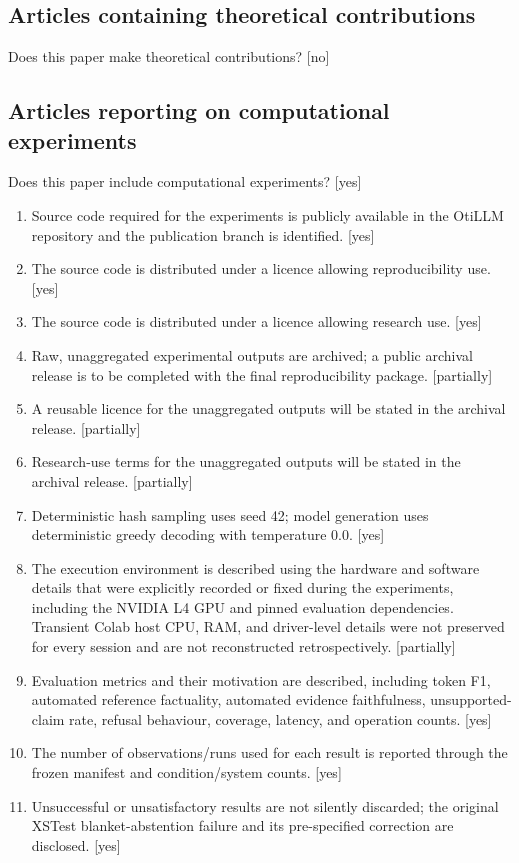 \documentclass[manuscript, screen, review]{jair}
\begin{document}
\subsection*{Articles containing theoretical contributions}
Does this paper make theoretical contributions? [no]

\subsection*{Articles reporting on computational experiments}
Does this paper include computational experiments? [yes]
\begin{enumerate}
\item Source code required for the experiments is publicly available in the OtiLLM repository and the publication branch is identified. [yes]
\item The source code is distributed under a licence allowing reproducibility use. [yes]
\item The source code is distributed under a licence allowing research use. [yes]
\item Raw, unaggregated experimental outputs are archived; a public archival release is to be completed with the final reproducibility package. [partially]
\item A reusable licence for the unaggregated outputs will be stated in the archival release. [partially]
\item Research-use terms for the unaggregated outputs will be stated in the archival release. [partially]
\item Deterministic hash sampling uses seed 42; model generation uses deterministic greedy decoding with temperature 0.0. [yes]
\item The execution environment is described using the hardware and software details that were explicitly recorded or fixed during the experiments, including the NVIDIA L4 GPU and pinned evaluation dependencies. Transient Colab host CPU, RAM, and driver-level details were not preserved for every session and are not reconstructed retrospectively. [partially]
\item Evaluation metrics and their motivation are described, including token F1, automated reference factuality, automated evidence faithfulness, unsupported-claim rate, refusal behaviour, coverage, latency, and operation counts. [yes]
\item The number of observations/runs used for each result is reported through the frozen manifest and condition/system counts. [yes]
\item Unsuccessful or unsatisfactory results are not silently discarded; the original XSTest blanket-abstention failure and its pre-specified correction are disclosed. [yes]

\end{enumerate}
\end{document}
